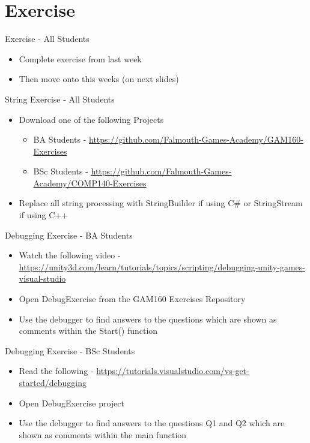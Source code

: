 \part{Exercise}
\frame{\partpage}

\begin{frame}{Exercise - All Students}
	\begin{itemize}
		\item Complete exercise from last week
		\item Then move onto this weeks (on next slides)
	\end{itemize}
\end{frame}

\begin{frame}{String Exercise - All Students}
\begin{itemize}
	\item Download one of the following Projects
	\begin{itemize}
		\item BA Students - \url{https://github.com/Falmouth-Games-Academy/GAM160-Exercises}
		\item BSc Students - \url{https://github.com/Falmouth-Games-Academy/COMP140-Exercises}
	\end{itemize}
	\item Replace all string processing with StringBuilder if using C\# or StringStream if using C++
\end{itemize}
\end{frame}

\begin{frame}{Debugging Exercise - BA Students}
	\begin{itemize}
		\item Watch the following video - \url{https://unity3d.com/learn/tutorials/topics/scripting/debugging-unity-games-visual-studio}
		\item Open DebugExercise from the GAM160 Exercises Repository
		\item Use the debugger to find answers to the questions which are shown as comments within the Start() function
	\end{itemize}
\end{frame}

\begin{frame}{Debugging Exercise - BSc Students}
	\begin{itemize}
		\item Read the following - \url{https://tutorials.visualstudio.com/vs-get-started/debugging}
		\item Open DebugExercise project
		\item Use the debugger to find answers to the questions Q1 and Q2 which are shown as comments within the main function
	\end{itemize}
\end{frame}

